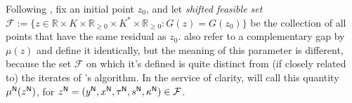 \begin{subappendices}
\begin{lproof}
    Following \textcite[pg. 231]{nesterov1996infeasible}, fix an initial point $z_0$, and let \emph{shifted feasible set}
    $\mathcal F := \{ z
        \in \mathbb R \times K \times \mathbb R_{\ge 0} \times K^* \times \mathbb R_{\ge 0}
        : G(z) = G(z_0)\}$
    be the collection of all points that have the same residual as $z_0$.
    \citeauthor*{nesterov1996infeasible} also refer to a complementary gap by $\mu(z)$ and define it identically, but the meaning of this parameter is different, because the set $\mathcal F$ on which it's defined is quite distinct from (if closely related to) the iterates of \citeauthor*{badenbroek2021algorithm}'s algorithm.
    In the service of clarity,
    will call this quantity $\mu^{\sf N}(z^{\sf N})$, for
    $z^{\sf N}
    = (y^{\sf N}, x^{\sf N}, \tau^{\sf N}, s^{\sf N}, \kappa^{\sf N})
    \in \mathcal F$.



\end{lproof}
\end{subappendices}
